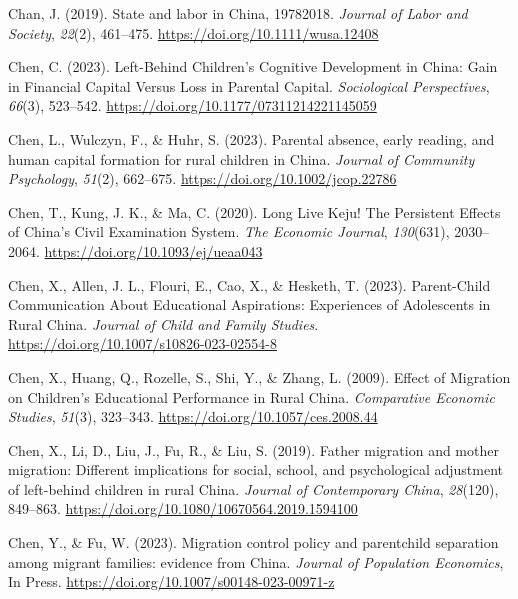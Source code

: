\documentclass[
  man]{apa7}
\newlength{\cslhangindent}
\newlength{\cslentryspacingunit} %
\newenvironment{CSLReferences}[2] %
 {%
  \setlength{\parindent}{0pt}
  \ifodd #1
  \let\oldpar\par
  \def\par{\hangindent=\cslhangindent\oldpar}
  \fi
  \setlength{\parskip}{#2\cslentryspacingunit}
 }%
 {}
\begin{document}
\begin{CSLReferences}{1}{0}
\leavevmode{}%
Chan, J. (2019). State and labor in {China}, 1978{\textendash}2018. \emph{Journal of Labor and Society}, \emph{22}(2), 461--475. \url{https://doi.org/10.1111/wusa.12408}

\leavevmode{}%
Chen, C. (2023). Left-Behind Children{'}s Cognitive Development in {China}: Gain in Financial Capital Versus Loss in Parental Capital. \emph{Sociological Perspectives}, \emph{66}(3), 523--542. \url{https://doi.org/10.1177/07311214221145059}

\leavevmode{}%
Chen, L., Wulczyn, F., \& Huhr, S. (2023). Parental absence, early reading, and human capital formation for rural children in {China}. \emph{Journal of Community Psychology}, \emph{51}(2), 662--675. \url{https://doi.org/10.1002/jcop.22786}

\leavevmode{}%
Chen, T., Kung, J. K., \& Ma, C. (2020). Long Live Keju! The Persistent Effects of {China}{'}s Civil Examination System. \emph{The Economic Journal}, \emph{130}(631), 2030--2064. \url{https://doi.org/10.1093/ej/ueaa043}

\leavevmode{}%
Chen, X., Allen, J. L., Flouri, E., Cao, X., \& Hesketh, T. (2023). Parent-Child Communication About Educational Aspirations: Experiences of Adolescents in Rural {China}. \emph{Journal of Child and Family Studies}. \url{https://doi.org/10.1007/s10826-023-02554-8}

\leavevmode{}%
Chen, X., Huang, Q., Rozelle, S., Shi, Y., \& Zhang, L. (2009). Effect of Migration on Children's Educational Performance in Rural {China}. \emph{Comparative Economic Studies}, \emph{51}(3), 323--343. \url{https://doi.org/10.1057/ces.2008.44}

\leavevmode{}%
Chen, X., Li, D., Liu, J., Fu, R., \& Liu, S. (2019). Father migration and mother migration: Different implications for social, school, and psychological adjustment of left-behind children in rural {China}. \emph{Journal of Contemporary {China}}, \emph{28}(120), 849--863. \url{https://doi.org/10.1080/10670564.2019.1594100}

\leavevmode{}%
Chen, Y., \& Fu, W. (2023). Migration control policy and parent{\textendash}child separation among migrant families: evidence from China. \emph{Journal of Population Economics}, In Press. \url{https://doi.org/10.1007/s00148-023-00971-z}


\end{CSLReferences}
\end{document}
